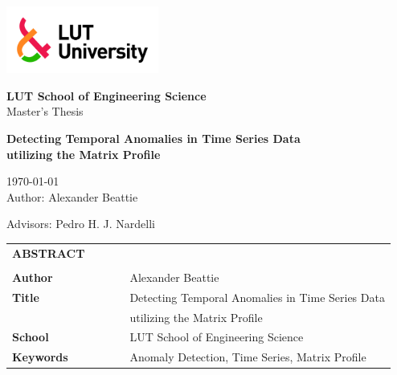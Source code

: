 \documentclass[a4paper,12pt]{article}
\begin{document}
\thispagestyle{empty}

% 

\begin{flushleft}
\includegraphics[width=5cm]{Images/lut5.jpg}

\textbf{LUT School of Engineering Science}\\
Master's Thesis\\


\end{flushleft}

\begin{center}
\vfill
\textbf{Detecting Temporal Anomalies in Time Series Data \\ utilizing the Matrix Profile }\\
\vfill
\end{center}

\begin{flushright}
\today \\ %
Author: Alexander Beattie %

Advisors: Pedro H. J. Nardelli\\ %

\end{flushright}
\titlepage
{}

\newpage

\noindent
\begin{table}[]
\begin{tabular}{lllll}
\textbf{ABSTRACT} \\                                                                                    
\\                                                                                                  
\textbf{Author}         &  &  &  & Alexander Beattie\\
\textbf{Title}          &  &  &  & Detecting Temporal Anomalies in Time Series Data  \\
                        &  &  &  & utilizing the Matrix Profile  \\
\textbf{School}         &  &  &  & LUT School of Engineering Science \\
\textbf{Keywords}       &  &  &  & Anomaly Detection, Time Series, Matrix Profile \\

\end{tabular}
\end{table}
\end{document}
